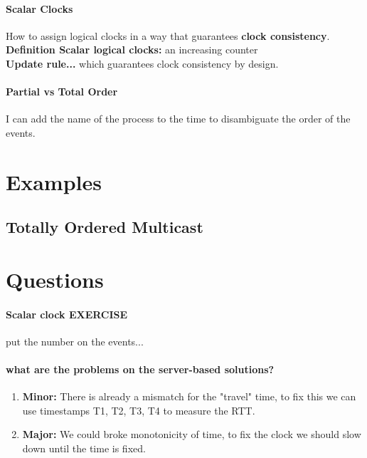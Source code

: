 \documentclass[11pt]{article}
\begin{document}
\paragraph{Scalar Clocks} %
\label{par:scalar_clocks}
How to assign logical clocks in a way that guarantees \textbf{clock consistency}.\\
\textbf{Definition Scalar logical clocks:} an increasing counter\\
\textbf{Update rule...} which guarantees clock consistency by design.

\paragraph{Partial vs Total Order} %
\label{par:partial_vs_total_order}
I can add the name of the process to the time to disambiguate the order of the events.

\section{Examples} %
\label{sec:examples}
\subsection{Totally Ordered Multicast} %
\label{sub:totally_ordered_multicast}


\section{Questions} %
\label{sec:questions}

\paragraph{Scalar clock EXERCISE} %
\label{par:scalar_clock_exercise}
put the number on the events...

\paragraph{what are the problems on the server-based solutions?} %
\label{par:q1}
\begin{enumerate}
	\item \textbf{Minor:} There is already a mismatch for the "travel" time, to fix this we can use timestamps T1, T2, T3, T4 to measure the RTT.
	\item \textbf{Major:} We could broke monotonicity of time, to fix the clock we should slow down until the time is fixed.
\end{enumerate}
\end{document}
